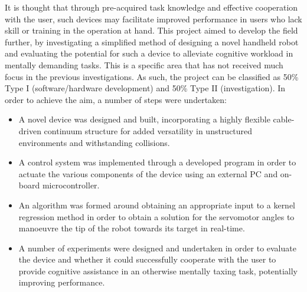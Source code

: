 \documentclass[11pt]{article}
\begin{document}
It is thought that through pre-acquired task knowledge and effective cooperation with the user, such devices may facilitate improved performance in users who lack skill or training in the operation at hand. This project aimed to develop the field further, by investigating a simplified method of designing a novel handheld robot and evaluating the potential for such a device to alleviate cognitive workload in mentally demanding tasks. This is a specific area that has not received much focus in the previous investigations. As such, the project can be classified as 50\% Type I (software/hardware development) and 50\% Type II (investigation). In order to achieve the aim, a number of steps were undertaken:
\begin{itemize}
\item{A novel device was designed and built, incorporating a highly flexible cable-driven continuum structure for added versatility in unstructured environments and withstanding collisions.}
\item{A control system was implemented through a developed program in order to actuate the various components of the device using an external PC and on-board microcontroller.}
\item{An algorithm was formed around obtaining an appropriate input to a kernel regression method in order to obtain a solution for the servomotor angles to manoeuvre the tip of the robot towards its target in real-time.}
\item{A number of experiments were designed and undertaken in order to evaluate the device and whether it could successfully cooperate with the user to provide cognitive assistance in an otherwise mentally taxing task, potentially improving performance.}
\end{itemize}  
\end{document}

